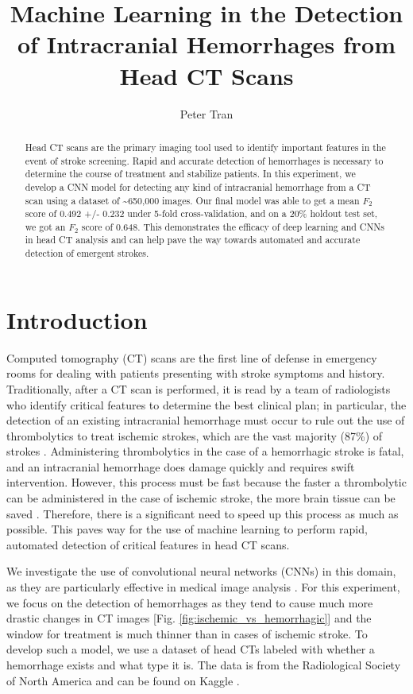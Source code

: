 \documentclass{article}
\title{Machine Learning in the Detection of Intracranial Hemorrhages from Head CT Scans}
\author{Peter Tran}
\date{}
\begin{document}
\maketitle

\begin{abstract}
    Head CT scans are the primary imaging tool used to identify important features in the event of stroke screening. Rapid and accurate detection of hemorrhages is necessary to determine the course of treatment and stabilize patients. In this experiment, we develop a CNN model for detecting any kind of intracranial hemorrhage from a CT scan using a dataset of \textasciitilde650,000 images. Our final model was able to get a mean $F_2$ score of 0.492 +/- 0.232 under 5-fold cross-validation, and on a 20\% holdout test set, we got an $F_2$ score of 0.648. This demonstrates the efficacy of deep learning and CNNs in head CT analysis and can help pave the way towards automated and accurate detection of emergent strokes.
\end{abstract}

\section{Introduction}
    Computed tomography (CT) scans are the first line of defense in emergency rooms for dealing with patients presenting with stroke symptoms and history. Traditionally, after a CT scan is performed, it is read by a team of radiologists who identify critical features to determine the best clinical plan; in particular, the detection of an existing intracranial hemorrhage must occur to rule out the use of thrombolytics to treat ischemic strokes, which are the vast majority (87\%) of strokes \cite{Dariush}. Administering thrombolytics in the case of a hemorrhagic stroke is fatal, and an intracranial hemorrhage does damage quickly and requires swift intervention. However, this process must be fast because the faster a thrombolytic can be administered in the case of ischemic stroke, the more brain tissue can be saved \cite{Ebinger}\cite{Fonarow}\cite{Strbian}. Therefore, there is a significant need to speed up this process as much as possible. This paves way for the use of machine learning to perform rapid, automated detection of critical features in head CT scans.
    
    We investigate the use of convolutional neural networks (CNNs) in this domain, as they are particularly effective in medical image analysis \cite{Anwar}. For this experiment, we focus on the detection of hemorrhages as they tend to cause much more drastic changes in CT images [Fig. \ref{fig:ischemic_vs_hemorrhagic}] and the window for treatment is much thinner than in cases of ischemic stroke. To develop such a model, we use a dataset of head CTs labeled with whether a hemorrhage exists and what type it is. The data is from the Radiological Society of North America and can be found on Kaggle \cite{Kaggle}.
    
\end{document}
